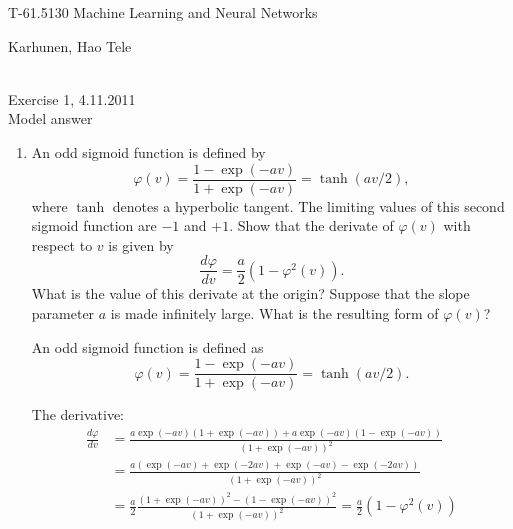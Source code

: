 \documentclass{exercise}
\begin{document}
\begin{Large}
\begin{bf} 
T-61.5130 Machine Learning and Neural Networks\\ 
\end{bf}
\end{Large}
Karhunen, Hao Tele\\  
\\
\begin{large}
\begin{bf}
Exercise 1,  4.11.2011\\Model answer
\end{bf}
\end{large}


\begin{enumerate}

\item

  An odd sigmoid function is defined by
  \begin{equation*}
    \varphi(v)=\frac{1-\exp(-av)}{1+\exp(-av)}=\tanh(av/2),
  \end{equation*}
  where $\tanh$ denotes a hyperbolic tangent. The limiting values of
  this second sigmoid function are $-1$ and $+1$. Show that the derivate 
  of $\varphi(v)$ with respect to $v$ is given by
  \begin{equation*}
    \frac{d\varphi}{dv}=\frac{a}{2}(1-\varphi^2(v)).
  \end{equation*}
  What is the value of this derivate at the origin? Suppose that the
  slope parameter $a$ is made infinitely large. What is the resulting
  form of $\varphi(v)$?  
  
  \begin{solution}

    An odd sigmoid function is defined as
    \begin{equation} \label{eq:sigmoid}
      \varphi(v)=\frac{1-\exp(-av)}{1+\exp(-av)}=\tanh(av/2).
    \end{equation}

    The derivative:
    \begin{equation}
      \begin{split}
        \frac{d\varphi}{dv}&=\frac{a\exp(-av) (1 + \exp(-av)) + a\exp(-av)
          (1 - \exp(-av))} {(1+\exp(-av))^2} \\
        &= \frac{a ( \exp(-av) + \exp(-2av) + \exp(-av) - \exp(-2av) )}{(1 +
          \exp(-av))^2} \\
        &= \frac{a}{2} \frac{(1 + \exp(-av))^2 - (1 - \exp(-av))^2}{(1 +
          \exp(-av))^2} = \frac{a}{2} ( 1 - \varphi^2(v) )
      \end{split}
    \end{equation}


\end{solution}
\end{enumerate}
\end{document}
